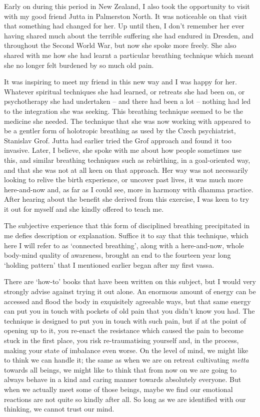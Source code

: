 Early on during this period in New Zealand, I also took the opportunity
to visit with my good friend Jutta in Palmerston North. It was
noticeable on that visit that something had changed for her. Up until
then, I don't remember her ever having shared much about the terrible
suffering she had endured in Dresden, and throughout the Second World
War, but now she spoke more freely. She also shared with me how she had
learnt a particular breathing technique which meant she no longer felt
burdened by so much old pain.

It was inspiring to meet my friend in this new way and I was happy for
her. Whatever spiritual techniques she had learned, or retreats she had
been on, or psychotherapy she had undertaken -- and there had been a lot
-- nothing had led to the integration she was seeking. This breathing
technique seemed to be the medicine she needed. The technique that she
was now working with appeared to be a gentler form of holotropic
breathing as used by the Czech psychiatrist, Stanislav Grof\cite{grof}.
Jutta had earlier tried the Grof approach and found it
too invasive. Later, I believe, she spoke with me about how people
sometimes use this, and similar breathing techniques such as rebirthing,
in a goal-oriented way, and that she was not at all keen on that
approach. Her way was not necessarily looking to relive the birth
experience, or uncover past lives, it was much more here-and-now and, as
far as I could see, more in harmony with dhamma practice. After hearing
about the benefit she derived from this exercise, I was keen to try it
out for myself and she kindly offered to teach me.

The subjective experience that this form of disciplined breathing
precipitated in me defies description or explanation. Suffice it to say
that this technique, which here I will refer to as `connected
breathing', along with a here-and-now, whole body-mind quality of
awareness, brought an end to the fourteen year long `holding pattern'
that I mentioned earlier began after my first vassa.

There are `how-to' books that have been written on this subject, but I
would very strongly advise against trying it out alone. An enormous
amount of energy can be accessed and flood the body in exquisitely
agreeable ways, but that same energy can put you in touch with pockets
of old pain that you didn't know you had. The technique is designed to
put you in touch with such pain, but if at the point of opening up to
it, you re-enact the resistance which caused the pain to become stuck in
the first place, you risk re-traumatising yourself and, in the process,
making your state of imbalance even worse. On the level of mind, we
might like to think we can handle it; the same as when we are on retreat
cultivating \emph{metta} towards all beings, we might like to think that from
now on we are going to always behave in a kind and caring manner towards
absolutely everyone. But when we actually meet some of those beings,
maybe we find our emotional reactions are not quite so kindly after all.
So long as we are identified with our thinking, we cannot trust our
mind.

